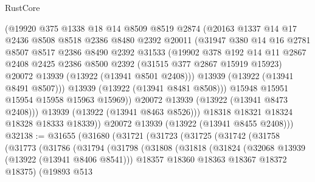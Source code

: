 \begin{lexlean}{RustCore}
\begin{coremodule}
                (@19920
                  @375
                  @1338
                  @18
                  @14
                  @8509
                  @8519
                  @2874
                  (@20163
                    @1337
                    @14
                    @17
                    @2436
                    @8508
                    @8518
                    @2386
                    @8480
                    @2392
                    @20011
                    (@31947
                      @380
                      @14
                      @16
                      @2781
                      @8507
                      @8517
                      @2386
                      @8490
                      @2392
                      @31533
                      (@19902
                        @378
                        @192
                        @14
                        @11
                        @2867
                        @2408
                        @2425
                        @2386
                        @8500
                        @2392
                        (@31515 @377 @2867 @15919 @15923)
                        @20072
                        @13939
                        (@13922 (@13941 @8501 @2408)))
                      @13939
                      (@13922 (@13941 @8491 @8507)))
                    @13939
                    (@13922 (@13941 @8481 @8508)))
                  @15948
                  @15951
                  @15954
                  @15958
                  @15963
                  @15969))
              @20072
              @13939
              (@13922 (@13941 @8473 @2408)))
            @13939
            (@13922 (@13941 @8463 @8526)))
          @18318
          @18321
          @18324
          @18328
          @18333
          @18339))
      @20072
      @13939
      (@13922 (@13941 @8455 @2408)))
@32138 := @31655
    (@31680
      (@31721
        (@31723
          (@31725
            (@31742
              (@31758
                (@31773
                  (@31786
                    (@31794
                      (@31798
                        (@31808
                          (@31818
                            (@31824
                              (@32068 @13939 (@13922 (@13941 @8406 @8541)))
                              @18357
                              @18360
                              @18363
                              @18367
                              @18372
                              @18375)
                            (@19893
                              @513

\end{coremodule}
\end{lexlean}
